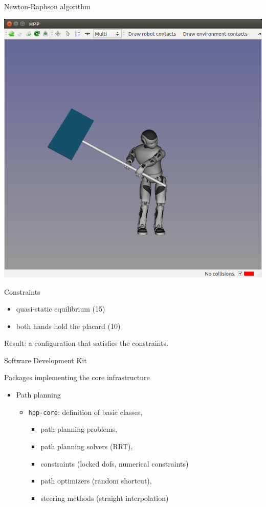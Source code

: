 \begin {frame} {Newton-Raphson algorithm}
  \parbox {.5\linewidth} {
    \centerline {
      \includegraphics [width=\linewidth] {figures/seq/romeo-7.png}
    }
  }
  \hspace*{.05\linewidth}
  \parbox {.39\linewidth} {
    Constraints
    \begin {itemize}
    \item quasi-static equilibrium (15)
    \item both hands hold the placard (10)
    \end{itemize}
  }
  \centerline {
    Result: a configuration that satisfies the constraints.
  }
\end {frame}

\begin {frame} {Software Development Kit}

Packages implementing the core infrastructure
\begin{itemize}
\item Path planning
  \begin{itemize}
  \item \texttt{hpp-core}: definition of basic classes,
    \begin{itemize}
      \item path planning problems,
      \item path planning solvers (RRT),
      \item constraints (locked dofs, numerical constraints)
      \item path optimizers (random shortcut),
      \item steering methods (straight interpolation)
    \end{itemize}
  \end{itemize}
\end{itemize}
\end {frame}


